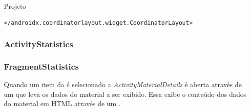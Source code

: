 \documentclass[
	12pt,				%
	openright,			%
	twoside,			%
	a4paper,			%
	english,			%
	french,				%
	spanish,			%
	brazil				%
	]{abntex2}
\begin{document}
\begin{chapter}{Projeto}
\begin{lstlisting}[numbers=none,basicstyle=\small,
caption={ActivityMaterialDetails.xml},
title={ActivityMaterialDetails.xml},
label={ActivityMaterialDetails.xml}]
</androidx.coordinatorlayout.widget.CoordinatorLayout>

\end{lstlisting}

\subsubsection{ActivityStatistics} \label{ActivityStatistics}
\subsubsection{FragmentStatistics} \label{FragmentStatistics}
Quando um item da  é selecionado a  \textit{ActivityMaterialDetails} é aberta através de um  que leva os dados do material a ser exibido. Essa  exibe o conteúdo dos dados do material em HTML através de um .


\end{chapter}
\end{document}
